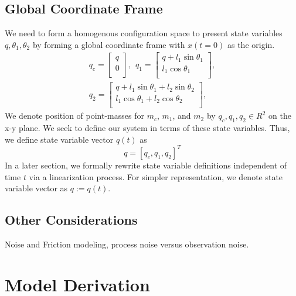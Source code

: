 \documentclass[journal]{IEEEtran}
\begin{document}
\subsection{Global Coordinate Frame}
We need to form a homogenous configuration space to present state variables
\(q, \theta_1, \theta_2\) by forming a global coordinate frame with \(x(t=0)\)
as the origin.
\begin{equation}
    \begin{split}
    q_c = \begin{bmatrix}
    q \\
    0 \\
    \end{bmatrix}, ~~
    q_1 = \begin{bmatrix}
    q + l_1 \sin \theta_1 \\
    l_1 \cos \theta_1 \\
    \end{bmatrix}, \\
    q_2 = \begin{bmatrix}
    q + l_1 \sin \theta_1 + l_2 \sin \theta_2 \\
    l_1 \cos \theta_1 + l_2 \cos \theta_2 \\
\end{bmatrix},
\end{split}
\end{equation}
\noindent
We denote position of point-masses for \(m_c\), \(m_1\), and
\(m_2\) by \(q_c, q_1, q_2 \in R^2\) on the x-y plane.
We seek to define our system in terms of these state variables. Thus, we define
state variable vector \(q(t)\) as
\begin{equation}
q = [q_c, q_1, q_2]^{T}
\end{equation}
In a later section, we formally rewrite state variable definitions independent of
time \(t\) via a linearization process. For simpler representation, we
denote state variable vector as \(q:=q(t)\).

\subsection{Other Considerations}
Noise and Friction modeling, process noise versus observation noise.

\section{Model Derivation}
\end{document}
